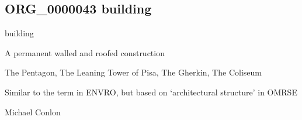 \documentclass[letterpaper,10pt,english]{sphinxmanual}
\begin{document}
\begin{sphinxShadowBox}

\sphinxAtStartPar
{}
\end{sphinxShadowBox}
\begin{quote}

\ignorespaces \end{quote}


\subsection{ORG\_0000043 \sphinxhyphen{} building}
\label{\detokenize{doc-ORG_0000043:org-0000043-building}}\label{\detokenize{doc-ORG_0000043:index-0}}\label{\detokenize{doc-ORG_0000043::doc}}
\begin{sphinxShadowBox}

\sphinxAtStartPar
building
\end{sphinxShadowBox}

\begin{sphinxShadowBox}

\sphinxAtStartPar
A permanent walled and roofed construction
\end{sphinxShadowBox}

\begin{sphinxShadowBox}

\sphinxAtStartPar
{}
\end{sphinxShadowBox}

\begin{sphinxShadowBox}

\sphinxAtStartPar
The Pentagon, The Leaning Tower of Pisa, The Gherkin, The Coliseum
\end{sphinxShadowBox}

\begin{sphinxShadowBox}

\sphinxAtStartPar
Similar to the term in ENVRO, but based on ‘architectural structure’ in OMRSE
\end{sphinxShadowBox}

\begin{sphinxShadowBox}

\sphinxAtStartPar
Michael Conlon 
\end{sphinxShadowBox}
\end{document}

